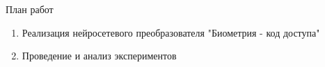 \begin{frame}{План работ}
    \begin{enumerate}
        \item Реализация нейросетевого преобразователя "Биометрия - код доступа"
        \item Проведение и анализ экспериментов
    \end{enumerate}
\end{frame}
